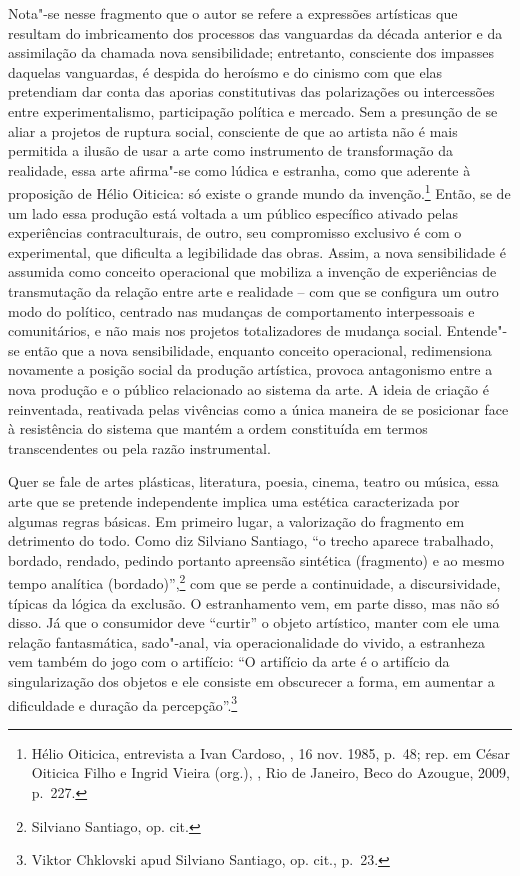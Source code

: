 Nota"-se nesse fragmento que o autor se refere a expressões artísticas
que resultam do imbricamento dos processos das vanguardas da década
anterior e da assimilação da chamada nova sensibilidade; entretanto,
consciente dos impasses daquelas vanguardas, é despida do heroísmo e do
cinismo com que elas pretendiam dar conta das aporias constitutivas das
polarizações ou intercessões entre experimentalismo, participação
política e mercado. Sem a presunção de se aliar a projetos de ruptura
social, consciente de que ao artista não é mais permitida a ilusão de
usar a arte como instrumento de transformação da realidade, essa arte
afirma"-se como lúdica e estranha, como que aderente à proposição de
Hélio Oiticica: só existe o grande mundo da invenção.\footnote{Hélio
Oiticica, entrevista a Ivan Cardoso, {}, 16 nov. 1985, p.~48; rep. em
César Oiticica Filho e Ingrid Vieira (org.),  {}, Rio de Janeiro,
Beco do Azougue, 2009, p.~227.} Então, se de um lado essa produção
está voltada a um público específico ativado pelas experiências
contraculturais, de outro, seu compromisso exclusivo é com o
experimental, que dificulta a legibilidade das obras. Assim, a nova
sensibilidade é assumida como conceito operacional que mobiliza a
invenção de experiências de transmutação da relação entre arte e
realidade -- com que se configura um outro modo do político, centrado
nas mudanças de comportamento interpessoais e comunitários, e não mais
nos projetos totalizadores de mudança social. Entende"-se então que a
nova sensibilidade, enquanto conceito operacional, redimensiona
novamente a posição social da produção artística, provoca antagonismo
entre a nova produção e o público relacionado ao sistema da arte. A
ideia de criação é reinventada, reativada pelas vivências como a única
maneira de se posicionar face à resistência do sistema que mantém a
ordem constituída em termos transcendentes ou pela razão instrumental.

Quer se fale de artes plásticas, literatura, poesia, cinema, teatro ou
música, essa arte que se pretende independente implica uma estética
caracterizada por algumas regras básicas. Em primeiro lugar, a
valorização do fragmento em detrimento do todo. Como diz Silviano
Santiago, ``o trecho aparece trabalhado, bordado, rendado, pedindo
portanto apreensão sintética (fragmento) e ao mesmo tempo analítica
(bordado)'',\footnote{Silviano Santiago, op. cit.} com que se perde a
continuidade, a discursividade, típicas da lógica da exclusão. O
estranhamento vem, em parte disso, mas não só disso. Já que o consumidor
deve ``curtir'' o objeto artístico, manter com ele uma relação
fantasmática, sado"-anal, via operacionalidade do vivido, a estranheza
vem também do jogo com o artifício: ``O artifício da arte é o artifício
da singularização dos objetos e ele consiste em obscurecer a forma, em
aumentar a dificuldade e duração da percepção''.\footnote{Viktor
  Chklovski apud Silviano Santiago, op. cit., p.~23.}

